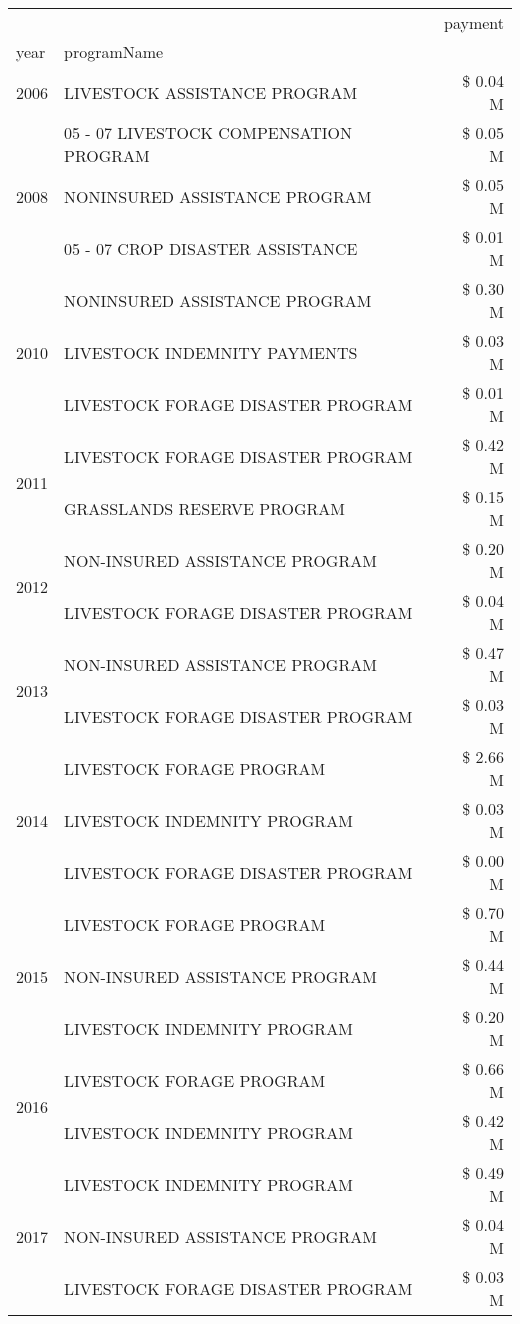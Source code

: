\begin{tabular}{llr}
\toprule
 &  & payment \\
year & programName &  \\
\midrule
2006 & LIVESTOCK ASSISTANCE PROGRAM & \$ 0.04 M \\
\cline{1-3}
\multirow[t]{3}{*}{2008} & 05 - 07 LIVESTOCK COMPENSATION PROGRAM & \$ 0.05 M \\
 & NONINSURED ASSISTANCE PROGRAM & \$ 0.05 M \\
 & 05 - 07 CROP DISASTER ASSISTANCE & \$ 0.01 M \\
\cline{1-3}
\multirow[t]{3}{*}{2010} & NONINSURED ASSISTANCE PROGRAM & \$ 0.30 M \\
 & LIVESTOCK INDEMNITY PAYMENTS & \$ 0.03 M \\
 & LIVESTOCK FORAGE DISASTER  PROGRAM & \$ 0.01 M \\
\cline{1-3}
\multirow[t]{2}{*}{2011} & LIVESTOCK FORAGE DISASTER PROGRAM & \$ 0.42 M \\
 & GRASSLANDS RESERVE PROGRAM & \$ 0.15 M \\
\cline{1-3}
\multirow[t]{2}{*}{2012} & NON-INSURED ASSISTANCE PROGRAM & \$ 0.20 M \\
 & LIVESTOCK FORAGE DISASTER PROGRAM & \$ 0.04 M \\
\cline{1-3}
\multirow[t]{2}{*}{2013} & NON-INSURED ASSISTANCE PROGRAM & \$ 0.47 M \\
 & LIVESTOCK FORAGE DISASTER PROGRAM & \$ 0.03 M \\
\cline{1-3}
\multirow[t]{3}{*}{2014} & LIVESTOCK FORAGE PROGRAM & \$ 2.66 M \\
 & LIVESTOCK INDEMNITY PROGRAM & \$ 0.03 M \\
 & LIVESTOCK FORAGE DISASTER PROGRAM & \$ 0.00 M \\
\cline{1-3}
\multirow[t]{3}{*}{2015} & LIVESTOCK FORAGE PROGRAM & \$ 0.70 M \\
 & NON-INSURED ASSISTANCE PROGRAM & \$ 0.44 M \\
 & LIVESTOCK INDEMNITY PROGRAM & \$ 0.20 M \\
\cline{1-3}
\multirow[t]{2}{*}{2016} & LIVESTOCK FORAGE PROGRAM & \$ 0.66 M \\
 & LIVESTOCK INDEMNITY PROGRAM & \$ 0.42 M \\
\cline{1-3}
\multirow[t]{3}{*}{2017} & LIVESTOCK INDEMNITY PROGRAM & \$ 0.49 M \\
 & NON-INSURED ASSISTANCE PROGRAM & \$ 0.04 M \\
 & LIVESTOCK FORAGE DISASTER PROGRAM & \$ 0.03 M \\

\end{tabular}
